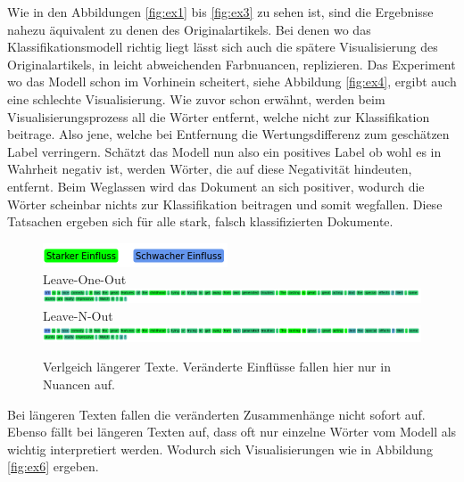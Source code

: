 \documentclass[DIV=13,fontsize=11pt]{scrartcl}
\begin{document}
Wie in den Abbildungen \ref{fig:ex1} bis \ref{fig:ex3} zu sehen ist, sind die Ergebnisse nahezu äquivalent zu denen des
Originalartikels. Bei denen wo das Klassifikationsmodell richtig liegt lässt sich auch die
spätere Visualisierung des Originalartikels, in leicht abweichenden Farbnuancen, replizieren.
Das Experiment wo das Modell schon im Vorhinein scheitert, siehe Abbildung \ref{fig:ex4}, ergibt auch eine schlechte Visualisierung.
Wie zuvor schon erwähnt, werden beim Visualisierungsprozess all die Wörter entfernt, welche nicht zur
Klassifikation beitrage. Also jene, welche bei Entfernung die Wertungsdifferenz zum geschätzen Label verringern.
Schätzt das Modell nun also ein positives Label ob wohl es in Wahrheit negativ ist, werden Wörter, die auf diese
Negativität hindeuten, entfernt. Beim Weglassen wird das Dokument an sich positiver, wodurch die Wörter
scheinbar nichts zur Klassifikation beitragen und somit wegfallen.
Diese Tatsachen ergeben sich für alle stark, falsch klassifizierten Dokumente.

\begin{figure}[H]
    \centering
    \includegraphics[]{img/legend.png}\\
    Leave-One-Out\\
    \includegraphics[width=\linewidth]{img/new_ex1_loo.png}\\
    Leave-N-Out\\
    \includegraphics[width=\linewidth]{img/new_ex1_lno.png}
    \caption{Verlgeich längerer Texte. Veränderte Einflüsse fallen hier nur in Nuancen auf.}
    \label{fig:ex5}
\end{figure}

Bei längeren Texten fallen die veränderten Zusammenhänge nicht sofort auf. Ebenso fällt bei längeren Texten auf, dass
oft nur einzelne Wörter vom Modell als wichtig interpretiert werden. Wodurch sich Visualisierungen wie in Abbildung \ref{fig:ex6} ergeben.
\end{document}
